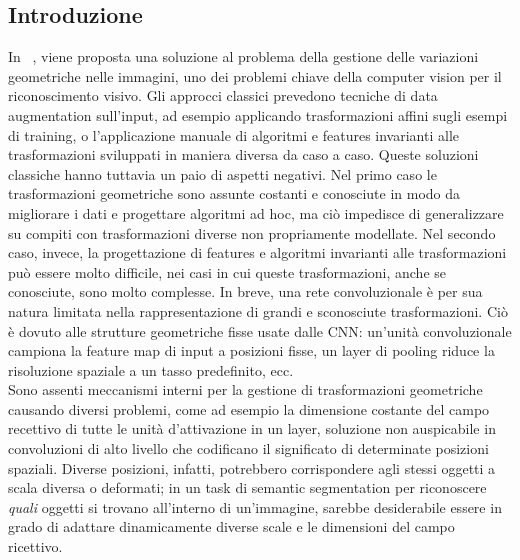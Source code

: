 \documentclass[12pt,a4paper]{report}
\begin{document}
        \subsection{Introduzione}
        In ~\cite{DBLP:journals/corr/DaiQXLZHW17}, viene proposta una 
        soluzione al problema della gestione delle variazioni 
        geometriche nelle immagini, uno dei problemi chiave della 
        computer vision per il riconoscimento visivo. Gli approcci 
        classici prevedono tecniche di data augmentation sull'input, ad
        esempio applicando trasformazioni affini sugli esempi di
        training, o l'applicazione manuale di algoritmi e features 
        invarianti alle trasformazioni sviluppati in maniera diversa da
        caso a caso. Queste soluzioni classiche hanno tuttavia un paio
        di aspetti negativi. Nel primo caso le trasformazioni 
        geometriche sono assunte costanti e conosciute in modo da 
        migliorare i dati e progettare algoritmi ad hoc, ma ci\`o 
        impedisce di generalizzare su compiti con trasformazioni 
        diverse non propriamente modellate. Nel secondo caso, invece, 
        la progettazione di features e algoritmi invarianti alle 
        trasformazioni pu\`o essere molto difficile, nei casi in cui 
        queste trasformazioni, anche se conosciute, sono molto 
        complesse. In breve, una rete convoluzionale \`e per sua 
        natura limitata nella rappresentazione di grandi e sconosciute 
        trasformazioni. Ci\`o \`e dovuto alle strutture geometriche 
        fisse usate dalle CNN: un'unit\`a convoluzionale campiona la 
        feature map di input a posizioni fisse, un layer di pooling 
        riduce la risoluzione spaziale a un tasso predefinito, ecc.\\ 
        Sono assenti meccanismi interni per la gestione di 
        trasformazioni geometriche causando diversi problemi, come ad 
        esempio la dimensione costante del campo recettivo di tutte le 
        unit\`a d'attivazione in un layer, soluzione non auspicabile in 
        convoluzioni di alto livello che codificano il significato di 
        determinate posizioni spaziali. Diverse posizioni, infatti, 
        potrebbero corrispondere agli stessi oggetti a scala diversa o
        deformati; in un task di semantic segmentation per riconoscere 
        \textit{quali} oggetti si trovano all'interno di un'immagine, 
        sarebbe desiderabile essere in grado di adattare dinamicamente 
        diverse scale e le dimensioni del campo ricettivo.
\end{document}

